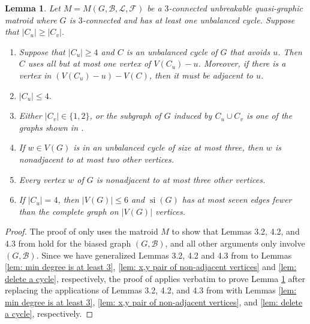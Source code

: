 \documentclass[12pt]{article}
\newtheorem{lemma}[theorem]{Lemma}
\theoremstyle{definition}
\theoremstyle{plain} %
\newcommand{\cB}{\mathcal{B}}
\newcommand{\cF}{\mathcal{F}}
\newcommand{\cL}{\mathcal{L}}
\DeclareMathOperator{\si}{si}
\begin{document}
\begin{lemma}\label{lem: 6 part lemma}
    Let $M=M(G,\cB,\cL,\cF)$ be a $3$-connected unbreakable quasi-graphic matroid where $G$ is $3$-connected and has at least one unbalanced cycle. Suppose that $|C_u| \geq |C_v|$. 
    \begin{enumerate}[$(i)$]
        \item Suppose that $|C_u| \geq 4$ and $C$ is an unbalanced cycle of $G$ that avoids $u$. Then $C$ uses all but at most one vertex of $V(C_u) - u$. Moreover, if there is a vertex in $(V(C_u)-u)-V(C)$, then it must be adjacent to $u$. 
        \item $|C_u| \leq 4$. 
        \item Either $\lvert C_v\rvert\in \{1,2\}$, or the subgraph of $G$ induced by $C_u\cup C_v$ is one of the graphs shown in \cite[Figure 1]{Fife-Mayhew-Oxley-Semple2020}.
        \item If $w\in V(G)$ is in an unbalanced cycle of size at most three, then $w$ is nonadjacent to at most two other vertices.
        \item Every vertex $w$ of $G$ is nonadjacent to at most three other vertices.
        \item If $\lvert C_u\rvert=4$, then $\lvert V(G)\rvert\leq6$ and $\si(G)$ has at most seven edges fewer than the complete graph on $\lvert V(G)\rvert$ vertices.  
\end{enumerate}
\end{lemma}
\begin{proof}
The proof of \cite[Lemma 4.4]{Fife-Mayhew-Oxley-Semple2020} only uses the matroid $M$ to show that Lemmas 3.2, 4.2, and 4.3 from \cite{Fife-Mayhew-Oxley-Semple2020} hold for the biased graph $(G, \cB)$, and all other arguments only involve $(G, \cB)$.
Since we have generalized Lemmas 3.2, 4.2 and 4.3 from \cite{Fife-Mayhew-Oxley-Semple2020} to Lemmas \ref{lem: min degree is at least 3}, \ref{lem: x,y pair of non-adjacent vertices} and \ref{lem: delete a cycle}, respectively, the proof of \cite[Lemma 4.4]{Fife-Mayhew-Oxley-Semple2020} applies verbatim to prove Lemma \ref{lem: 6 part lemma} after replacing the applications of Lemmas 3.2, 4.2, and 4.3 from \cite{Fife-Mayhew-Oxley-Semple2020} with Lemmas \ref{lem: min degree is at least 3}, \ref{lem: x,y pair of non-adjacent vertices}, and \ref{lem: delete a cycle}, respectively.
\end{proof}


\end{document}
